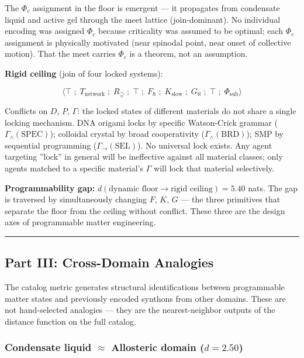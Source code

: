 \documentclass[12pt,a4paper]{article}
\begin{document}
The $\Phi_c$ assignment in the floor is emergent --- it propagates from condensate liquid and active gel through the meet lattice (join-dominant). No individual encoding was assigned $\Phi_c$ because criticality was assumed to be optimal; each $\Phi_c$ assignment is physically motivated (near spinodal point, near onset of collective motion). That the meet carries $\Phi_c$ is a theorem, not an assumption.

\textbf{Rigid ceiling} (join of four locked systems):

\[\langle \top \;;\; T_\text{network} \;;\; R_{\supseteq} \;;\; \top \;;\; F_\hbar \;;\; K_\text{slow} \;;\; G_\aleph \;;\; \top \;;\; \Phi_\text{sub} \rangle\]

Conflicts on $D$, $P$, $\Gamma$: the locked states of different materials do not share a single locking mechanism. DNA origami locks by specific Watson-Crick grammar ($\Gamma_\wedge(\text{SPEC})$); colloidal crystal by broad cooperativity ($\Gamma_\wedge(\text{BRD})$); SMP by sequential programming ($\Gamma_\to(\text{SEL})$). No universal lock exists. Any agent targeting ''lock'' in general will be ineffective against all material classes; only agents matched to a specific material's $\Gamma$ will lock that material selectively.

\textbf{Programmability gap:} $d(\text{dynamic floor} \to \text{rigid ceiling}) = 5.40$ nats. The gap is traversed by simultaneously changing $F$, $K$, $G$ --- the three primitives that separate the floor from the ceiling without conflict. These three are the design axes of programmable matter engineering.

\begin{center}
\rule{0.5\textwidth}{0.4pt}
\end{center}

\subsection{Part III: Cross-Domain Analogies}

The catalog metric generates structural identifications between programmable matter states and previously encoded synthons from other domains. These are not hand-selected analogies --- they are the nearest-neighbor outputs of the distance function on the full catalog.

\subsubsection{Condensate liquid $\approx$ Allosteric domain ($d = 2.50$)}
\end{document}
